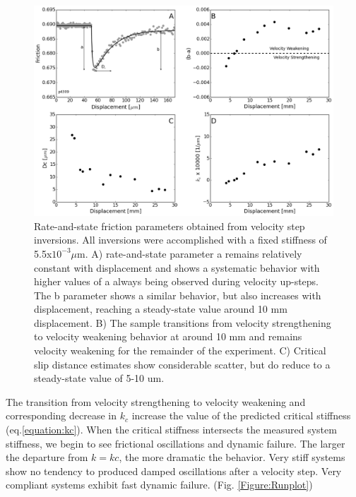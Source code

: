 \documentclass[11pt]{article}
\begin{document}
\begin{figure}
    \centering
        \includegraphics[scale=0.45]{../Figures/Fig_RSF_Parameters/RSF_Parameters.png}
       \caption{Rate-and-state friction parameters obtained from velocity step
       inversions. All inversions were accomplished with a fixed stiffness of
       5.5x$10 ^ {-3} \mu$m. A) rate-and-state parameter a remains relatively
       constant with displacement and shows a systematic behavior with higher
       values of a always being observed during velocity up-steps. The b
       parameter shows a similar behavior, but also increases with displacement,
       reaching a steady-state value around 10 mm displacement. B) The sample
       transitions from velocity strengthening to velocity weakening  behavior
       at around 10 mm and remains velocity weakening for the remainder of  the
       experiment. C) Critical slip distance estimates show considerable
       scatter,  but do reduce to a steady-state value of 5-10 um.  }
      \label{Figure:RSF Props}
\end{figure}

The transition from velocity strengthening to velocity weakening and
corresponding decrease in $k_c$ increase the value of the predicted critical
stiffness (eq.\ref{equation:kc}). When the critical stiffness intersects the
measured system stiffness, we begin to see frictional oscillations and dynamic
failure. The larger the departure from $k=kc$, the more dramatic the behavior.
Very stiff systems show no tendency to produced damped oscillations after a
velocity step. Very compliant systems exhibit fast dynamic failure. (Fig.
\ref{Figure:Runplot})
\end{document}
